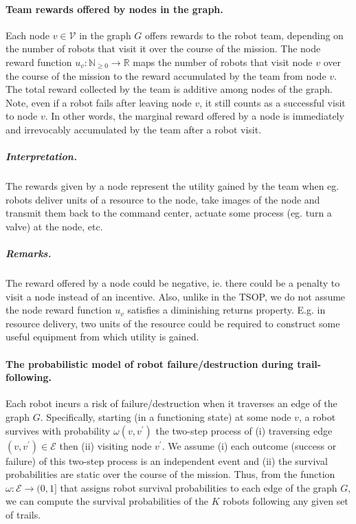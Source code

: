 \documentclass[11pt, oneside]{article}
\begin{document}
\paragraph{Team rewards offered by nodes in the graph.}
Each node $v\in \mathcal{V}$ in the graph $G$ offers rewards to the robot team, depending on the number of robots that visit it over the course of the mission. 
The node reward function $u_v: \mathbb{N}_{\geq 0} \rightarrow \mathbb{R}$ maps 
the number of robots that visit node $v$ over the course of the mission
 to 
 the reward accumulated by the team from node $v$.
 The total reward collected by the team is additive among nodes of the graph.
Note, even if a robot fails after leaving node $v$, it still counts as a successful visit to node $v$.
In other words, the marginal reward offered by a node is immediately and irrevocably accumulated by the team after a robot visit.

\vspace{-\baselineskip}
\subparagraph{Interpretation.} The rewards given by a node represent the utility gained by the team when eg. robots deliver units of a resource to the node, take images of the node and transmit them back to the command center, actuate some process (eg. turn a valve) at the node, etc. 

\vspace{-\baselineskip}
\subparagraph{Remarks.} The reward offered by a node could be negative, ie. there could be a penalty to visit a node instead of an incentive.
Also, unlike in the TSOP, we do not assume the node reward function $u_v$ satisfies a diminishing returns property. E.g. in resource delivery, two units of the resource could be required to construct some useful equipment from which utility is gained.


\paragraph{The probabilistic model of robot failure/destruction during trail-following.} 
Each robot incurs a risk of failure/destruction when it traverses an edge of the graph $G$.
Specifically, starting (in a functioning state) at some node $v$, a robot survives with probability $\omega(v, v^\prime)$ the two-step process of (i) traversing edge $(v, v^\prime) \in \mathcal{E}$ then (ii) visiting node $v^\prime$. 
We assume (i) each outcome (success or failure) of this two-step process is an independent event and (ii) the survival probabilities are static over the course of the mission. 
Thus, from the function $\omega: \mathcal{E} \rightarrow (0, 1]$ that assigns robot survival probabilities to each edge of the graph $G$, we can compute the survival probabilities of the $K$ robots following any given set of trails.
\end{document}
